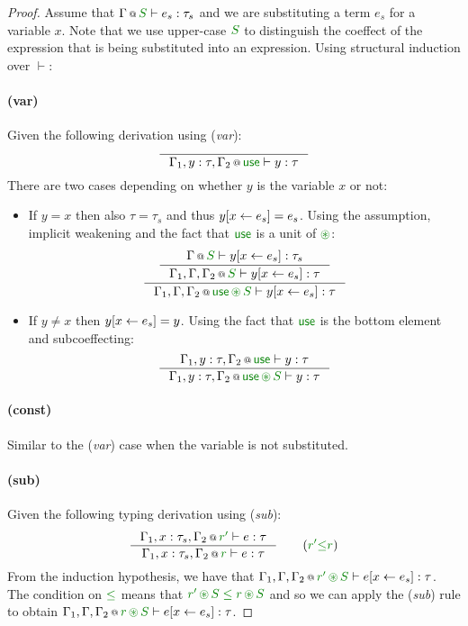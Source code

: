 \begin{proof}
Assume that $\coctx{\Gamma}{\cclrd{S}} \vdash e_s : \tau_s$ and we are substituting a term $e_s$ for 
a variable $x$. Note that we use upper-case $\cclrd{S}$ to distinguish the coeffect of the expression
that is being substituted into an expression. Using structural induction over $\vdash$:

\paragraph{(var)} Given the following derivation using (\emph{var}):
\[
\inference
  { }
  {\coctx{\Gamma_1, y:\tau, \Gamma_2}{\cunit} \vdash y : \tau }
\]
There are two cases depending on whether $y$ is the variable $x$ or not:
\begin{itemize}
\item If $y=x$ then also $\tau = \tau_s$ and thus $y[x \leftarrow e_s] = e_s$. Using the assumption,
implicit weakening and the fact that $\cunit$ is a unit of $\cseq$:
\[
\inference
 {\inference 
  {\coctx{\Gamma}{\cclrd{S}} \vdash \subst{y}{x}{e_s} : \tau_s }
  {\coctx{\Gamma_1, \Gamma, \Gamma_2}{\cclrd{S}} \vdash \subst{y}{x}{e_s} : \tau } }
 {\coctx{\Gamma_1, \Gamma, \Gamma_2}{\cunit\,\cseq\,\cclrd{S}} \vdash \subst{y}{x}{e_s} : \tau } 
\]
\item If $y\neq x$ then $y[x \leftarrow e_s] = y$. Using the fact that $\cunit$ is the bottom element
and subcoeffecting:
\[
\inference
  {\coctx{\Gamma_1, y:\tau, \Gamma_2}{\cunit} \vdash y : \tau }
  {\coctx{\Gamma_1, y:\tau, \Gamma_2}{\cunit\,\cseq\,\cclrd{S}} \vdash y : \tau }
\]
\end{itemize}

\paragraph{(const)} Similar to the (\emph{var}) case when the variable is not substituted.

\paragraph{(sub)} Given the following typing derivation using (\emph{sub}):
\[
\inference
  {\coctx{\Gamma_1,x:\tau_s,\Gamma_2}{\cclrd{r'}} \vdash e : \tau }
  {\coctx{\Gamma_1,x:\tau_s,\Gamma_2}{\cclrd{r}} \vdash e : \tau }\quad\quad(\cclrd{r'} \cleq \cclrd{r})
\]
From the induction hypothesis, we have that
$\coctx{\Gamma_1,\Gamma,\Gamma_2}{\cclrd{r'}\,\cseq\,\cclrd{S}} \vdash \subst{e}{x}{e_s} : \tau$.
The condition on $\cleq$ means that $\cclrd{r'}\,\cseq\,\cclrd{S}\;\cleq\;\cclrd{r}\,\cseq\,\cclrd{S}$
and so we can apply the (\emph{sub}) rule to obtain
$\coctx{\Gamma_1,\Gamma,\Gamma_2}{\cclrd{r}\,\cseq\,\cclrd{S}} \vdash \subst{e}{x}{e_s} : \tau$.


\end{proof}
